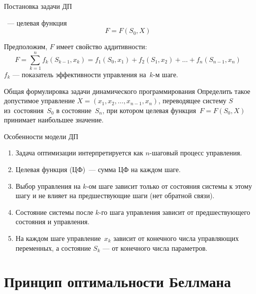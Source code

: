\documentclass[unicode,11pt,notheorems,xcolor=table]{beamer}
\begin{document}
\begin{frame}{Постановка задачи ДП}

~--- целевая функция
$$
	F = F(S_0,X)
$$



Предположим, $F$ имеет \alert{свойство аддитивности}:
$$
		F=\sum_{k=1}^n f_k(S_{k-1},x_k) = f_1(S_0,x_1)+f_2(S_1,x_2)+\ldots+ f_n(S_{n-1},x_n)
$$
$f_k$ --- показатель эффективности управления на~$k$-м шаге.

\bigskip

\begin{block}{Общая формулировка задачи динамического программирования}
	Определить такое допустимое управление $X = (x_1,x_2,\ldots,x_{n-1},x_n)$, переводящее систему  $S$  из~состояния~$S_0$  в состояние~$S_n$, при котором целевая функция~$F=F(S_0,X)$ принимает наибольшее значение.
\end{block}
\end{frame}

\begin{frame}{Особенности модели ДП}{}
\begin{enumerate}
\item 
	Задача оптимизации интерпретируется как $n$-шаговый процесс управления.
\item 
	Целевая функция (ЦФ)~--- сумма ЦФ на каждом шаге.
\item 
	Выбор управления на $k$-ом шаге зависит только от состояния системы к этому шагу и не влияет на предшествующие шаги (нет обратной связи).
\item 
	Состояние системы после $k$-го шага управления зависит от предшествующего состояния и управления.
\item 
	На каждом шаге управление~$x_k$  зависит от конечного числа управляющих переменных, а состояние  $S_k$ --- от конечного числа параметров.
\end{enumerate}
\end{frame}


\section{Принцип оптимальности Беллмана}
\end{document}
